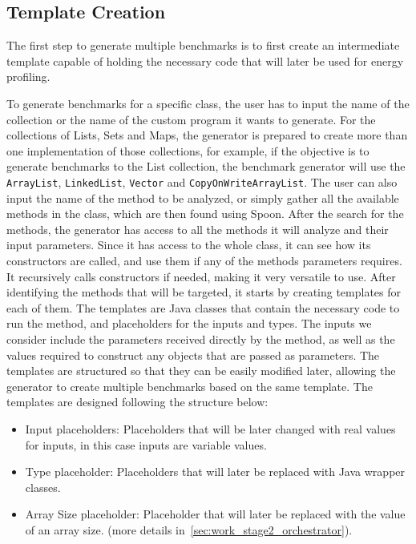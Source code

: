 \subsection{Template Creation} \label{sec:work_stage1_template_creation}

The first step to generate multiple benchmarks is to first create an intermediate template capable of holding the necessary code that will later be used for energy profiling.

To generate benchmarks for a specific class, the user has to input the name of the collection or the name of the custom program it wants to generate. For the collections of Lists, Sets and Maps, the generator is prepared to create more than one implementation of those collections, for example, if the objective is to generate benchmarks to the List collection, the benchmark generator will use the \texttt{ArrayList}, \texttt{LinkedList}, \texttt{Vector} and \texttt{CopyOnWriteArrayList}. The user can also input the name of the method to be analyzed, or simply gather all the available methods in the class, which are then found using Spoon.
After the search for the methods, the generator has access to all the methods it will analyze and their input parameters. 
Since it has access to the whole class, it can see how its constructors are called, and use them if any of the methods parameters requires. 
It recursively calls constructors if needed, making it very versatile to use. After identifying the methods that will be targeted, it starts by creating templates for each of them. The templates are Java classes that contain the necessary code to run the method, and placeholders for the inputs and types. The inputs we consider include the parameters received directly by the method, as well as the values required to construct any objects that are passed as parameters. The templates are structured so that they can be easily modified later, allowing the generator to create multiple benchmarks based on the same template. The templates are designed following the structure below:

\begin{itemize}

\item Input placeholders: Placeholders that will be later changed with real values for inputs, in this case inputs are variable values. 

\item Type placeholder: Placeholders that will later be replaced with Java wrapper classes.
  
\item Array Size placeholder: Placeholder that will later be replaced with the value of an array size. (more details in~\ref{sec:work_stage2_orchestrator}). 

\end{itemize}

